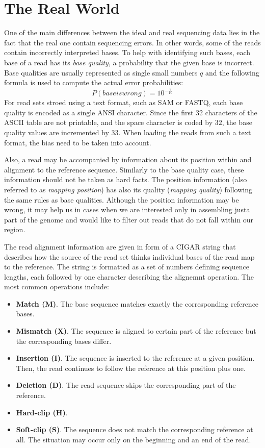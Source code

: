 \section{The Real World}
\label{sec:real-world}

One of the main differences between the ideal and real sequencing data lies in the fact that the real one contain sequencing errors. In other words, some of the reads contain incorrectly interpreted bases. To help with identifying such bases, each base of a read has its \textit{base quality}, a probability that the given base is incorrect. Base qualities are usually represented as single small numbers $q$ and the following formula is used to compute the actual error probabilities:
$$
P(base is wrong) = 10^{-\frac{q}{10}}
$$
For read sets stroed using a text format, such as SAM or FASTQ, each base quality is encoded as a single ANSI character. Since the first 32 characters of the ASCII table are not printable, and the space character is coded by $32$, the base quality values are incremented by $33$. When loading the reads from such a text format, the bias need to be taken into account. 

Also, a read may be accompanied by information about its position within and alignment to the reference sequence. Similarly to the base quality case, these information should not be taken as hard facts. The position information (also referred to as \textit{mapping position}) has also its quality (\textit{mapping quality}) following the same rules as base qualities. Although the position information may be wrong, it may help us in cases when we are interested only in assembling justa part of the genome and would like to filter out reads that do not fall within our region.

The read alignment information are given in form of a CIGAR string that describes how the source of the read set thinks individual bases of the read map to the reference. The string is formatted as a set of numbers defining sequence lengths, each followed by one character describing the alignemnt operation. The most common operations include:
\begin{itemize}
\item \textbf{Match (M)}. The base sequence matches exactly the corresponding reference bases.
\item \textbf{Mismatch (X)}. The sequence is aligned to certain part of the reference but the corresponding bases differ.
\item \textbf{Insertion (I)}. The sequence is inserted to the reference at a given position. Then, the read continues to follow the reference at this position plus one.
\item \textbf{Deletion (D)}. The read sequence skips the corresponding part of the reference.
\item \textbf{Hard-clip (H)}. 
\item \textbf{Soft-clip (S)}. The sequence does not match the corresponding reference at all. The situation may occur only on the beginning and an end of the read.
\end{itemize}

